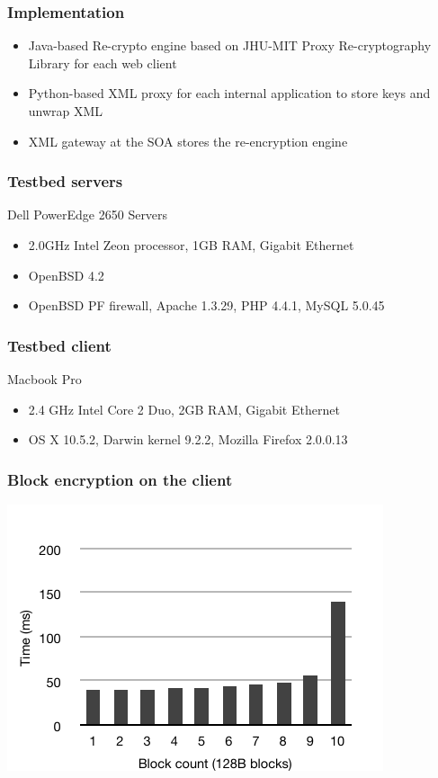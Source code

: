 \documentclass{beamer}
\begin{document}
\begin{frame}
\frametitle{Implementation}
\begin{itemize}
\item Java-based Re-crypto engine based on JHU-MIT Proxy Re-cryptography
Library for each web client
\item Python-based XML proxy for each internal application to store keys and
unwrap XML
\item XML gateway at the SOA stores the re-encryption engine 
\end{itemize}
\end{frame}

\begin{frame}
\frametitle{Testbed servers}
Dell PowerEdge 2650 Servers
\begin{itemize}
\item 2.0GHz Intel Zeon processor, 1GB RAM, Gigabit Ethernet
\item OpenBSD 4.2
\item OpenBSD PF firewall, Apache 1.3.29, PHP 4.4.1, MySQL 5.0.45 
\end{itemize}
\end{frame}

\begin{frame}
\frametitle{Testbed client}
Macbook Pro
\begin{itemize}
\item 2.4 GHz Intel Core 2 Duo, 2GB RAM, Gigabit Ethernet
\item OS X 10.5.2, Darwin kernel 9.2.2, Mozilla Firefox 2.0.0.13
\end{itemize}
\end{frame}

\begin{frame}
\frametitle{Block encryption on the client}
\begin{center}
\includegraphics{client_field_count_new} \\
\end{center}
\end{frame}
\end{document}
